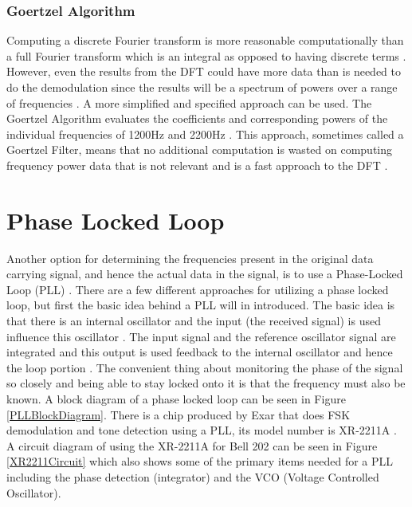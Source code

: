 \subsubsection{Goertzel Algorithm}
Computing a discrete Fourier transform is more reasonable computationally than a full Fourier transform which is an integral as opposed to having discrete terms \cite{WikipediaFT}. However, even the results from the DFT could have more data than is needed to do the demodulation since the results will be a spectrum of powers over a range of frequencies \cite{WikipediaDFT,WikipediaFFT}. A more simplified and specified approach can be used. The Goertzel Algorithm evaluates the coefficients and corresponding powers of the individual frequencies of 1200Hz and 2200Hz \cite{WikipediaGA,Elmenreich2011}. This approach, sometimes called a Goertzel Filter, means that no additional computation is wasted on computing frequency power data that is not relevant and is a fast approach to the DFT \cite{SanjitK1993}.

\section{Phase Locked Loop}
Another option for determining the frequencies present in the original data carrying signal, and hence the actual data in the signal, is to use a Phase-Locked Loop (PLL) \cite{Akoum,Perrott2009,Lutus2011}. There are a few different approaches for utilizing a phase locked loop, but first the basic idea behind a PLL will in introduced. The basic idea is that there is an internal oscillator and the input (the received signal) is used influence this oscillator \cite{Gaeddert2013} . The input signal and the reference oscillator signal are integrated and this output is used feedback to the internal oscillator and hence the loop portion \cite{Roppel}. The convenient thing about monitoring the phase of the signal so closely and being able to stay locked onto it is that the frequency must also be known. A block diagram of a phase locked loop can be seen in Figure \ref{PLLBlockDiagram}. There is a chip produced by Exar that does FSK demodulation and tone detection using a PLL, its model number is XR-2211A \cite{EXAR1997}. A circuit diagram of using the XR-2211A for Bell 202 can be seen in Figure \ref{XR2211Circuit} which also shows some of the primary items needed for a PLL including the phase detection (integrator) and the VCO (Voltage Controlled Oscillator).

